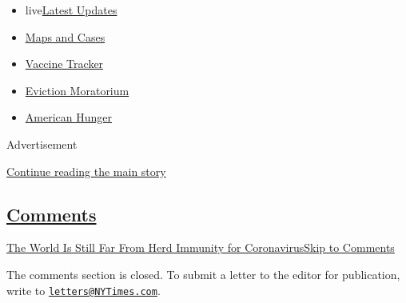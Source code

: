 \begin{itemize}
\tightlist
\item
  live\href{https://www.nytimes3xbfgragh.onion/2020/09/05/world/coronavirus-covid.html?name=styln-coronavirus-national\&region=TOP_BANNER\&block=storyline_menu_recirc\&action=click\&pgtype=Interactive\&impression_id=b5442d31-efb3-11ea-a1b4-338358db981a\&variant=undefined}{Latest
  Updates}
\item
  \href{https://www.nytimes3xbfgragh.onion/interactive/2020/us/coronavirus-us-cases.html?name=styln-coronavirus-national\&region=TOP_BANNER\&block=storyline_menu_recirc\&action=click\&pgtype=Interactive\&impression_id=b5442d32-efb3-11ea-a1b4-338358db981a\&variant=undefined}{Maps
  and Cases}
\item
  \href{https://www.nytimes3xbfgragh.onion/interactive/2020/science/coronavirus-vaccine-tracker.html?name=styln-coronavirus-national\&region=TOP_BANNER\&block=storyline_menu_recirc\&action=click\&pgtype=Interactive\&impression_id=b5442d33-efb3-11ea-a1b4-338358db981a\&variant=undefined}{Vaccine
  Tracker}
\item
  \href{https://www.nytimes3xbfgragh.onion/2020/09/02/your-money/eviction-moratorium-covid.html?name=styln-coronavirus-national\&region=TOP_BANNER\&block=storyline_menu_recirc\&action=click\&pgtype=Interactive\&impression_id=b5442d34-efb3-11ea-a1b4-338358db981a\&variant=undefined}{Eviction
  Moratorium}
\item
  \href{https://www.nytimes3xbfgragh.onion/interactive/2020/09/02/magazine/food-insecurity-hunger-us.html?name=styln-coronavirus-national\&region=TOP_BANNER\&block=storyline_menu_recirc\&action=click\&pgtype=Interactive\&impression_id=b5442d35-efb3-11ea-a1b4-338358db981a\&variant=undefined}{American
  Hunger}
\end{itemize}

Advertisement

\protect\hyperlink{after-top}{Continue reading the main story}

\hypertarget{comments}{%
\subsection{\texorpdfstring{\protect\hyperlink{commentsContainer}{Comments}}{Comments}}\label{comments}}

\href{}{The World Is Still Far From Herd Immunity for
Coronavirus}\href{}{Skip to Comments}

The comments section is closed. To submit a letter to the editor for
publication, write to
\href{mailto:letters@NYTimes.com}{\nolinkurl{letters@NYTimes.com}}.


